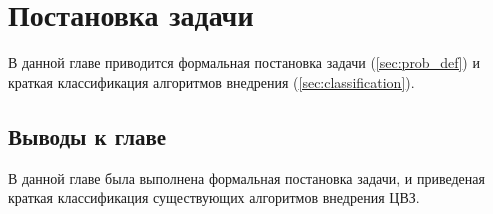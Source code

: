 \chapter{Постановка задачи}

В данной главе приводится формальная постановка задачи (\ref{sec:prob_def}) и
краткая классификация алгоритмов внедрения (\ref{sec:classification}).




\section{Выводы к главе}
В данной главе была выполнена формальная постановка задачи, и приведеная краткая классификация существующих алгоритмов внедрения ЦВЗ.
